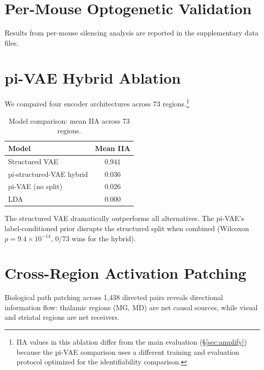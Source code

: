 \documentclass{article}
\begin{document}
\section{Per-Mouse Optogenetic Validation}
\label{app:per_mouse}

Results from per-mouse silencing analysis are reported in the supplementary data files.


\section{pi-VAE Hybrid Ablation}
\label{app:pivae}

We compared four encoder architectures across 73 regions.\footnote{IIA values in this ablation differ from the main evaluation (\S\ref{sec:amplify}) because the pi-VAE comparison uses a different training and evaluation protocol optimized for the identifiability comparison.}

\begin{table}[h]
\centering
\small
\caption{Model comparison: mean IIA across 73 regions.}
\label{tab:pivae}
\begin{tabular}{@{}lc@{}}
\toprule
\textbf{Model} & \textbf{Mean IIA} \\
\midrule
Structured VAE & $\mathbf{0.941}$ \\
pi-structured-VAE hybrid & $0.036$ \\
pi-VAE (no split) & $0.026$ \\
LDA & $0.000$ \\
\bottomrule
\end{tabular}
\end{table}

The structured VAE dramatically outperforms all alternatives. The pi-VAE's label-conditioned prior disrupts the structured split when combined (Wilcoxon $p = 9.4 \times 10^{-14}$, 0/73 wins for the hybrid).


\section{Cross-Region Activation Patching}
\label{app:patching}

Biological path patching across 1,438 directed pairs reveals directional information flow: thalamic regions (MG, MD) are net causal sources, while visual and striatal regions are net receivers.
\end{document}
